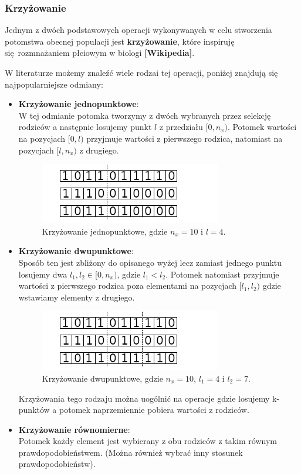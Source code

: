 \documentclass{article}
\begin{document}
\subsubsection{Krzyżowanie}
Jednym z dwóch podstawowych operacji wykonywanych w celu stworzenia potomstwa obecnej populacji
jest \textbf{krzyżowanie}, które inspiruję się rozmnażaniem płciowym w biologi
\textbf{[Wikipedia]}.

W literaturze możemy znaleźć wiele rodzai tej operacji, poniżej znajdują się najpopularniejsze
odmiany:
\begin{itemize}
\item \textbf{Krzyżowanie jednopunktowe}:\\
W tej odmianie potomka tworzymy z dwóch wybranych przez selekcję rodziców a następnie 
losujemy punkt $l$ z przedziału $[0, n_x)$. Potomek wartości na pozycjach $[0, l)$
przyjmuje wartości z pierwszego rodzica, natomiast na pozycjach $[l, n_x)$ z drugiego.
\begin{figure}[H]
\centering
\includegraphics[scale=5.0]{crossover.png}
\caption{Krzyżowanie jednopunktowe, gdzie $n_x = 10$ i $l = 4$.}
\end{figure}

\item \textbf{Krzyżowanie dwupunktowe}:\\
Sposób ten jest zbliżony do opisanego wyżej lecz zamiast jednego punktu losujemy dwa
$l_1, l_2 \in [0, n_x)$, gdzie $l_1 < l_2$. Potomek natomiast przyjmuje wartości z pierwszego
rodzica poza elementami na pozycjach $[l_1, l_2)$ gdzie wstawiamy elementy z drugiego.

\begin{figure}[H]
\centering
\includegraphics[scale=5.0]{two_crossover.png}
\caption{Krzyżowanie dwupunktowe, gdzie $n_x = 10$, $l_1 = 4$ i $l_2 = 7$.}
\end{figure}

Krzyżowania tego rodzaju można uogólnić na operacje gdzie losujemy k-punktów
a potomek naprzemiennie pobiera wartości z rodziców.\\
\item \textbf{Krzyżowanie równomierne}:\\
Potomek każdy element jest wybierany z obu rodziców z takim równym prawdopodobieństwem.
(Można również wybrać inny stosunek prawdopodobieństw).

\end{itemize}
\end{document}
